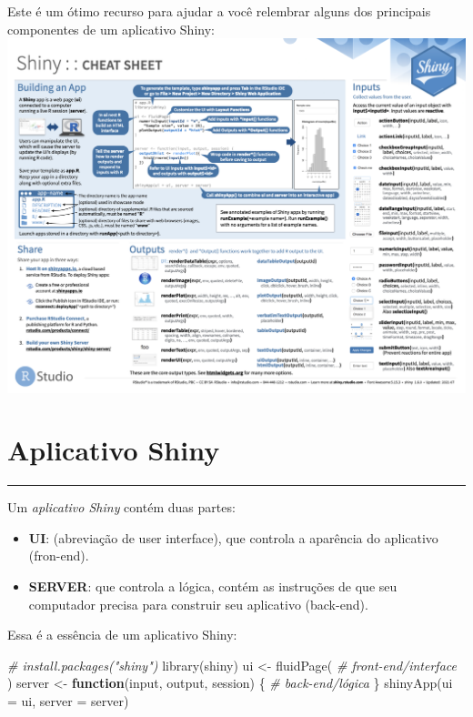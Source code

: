 \documentclass[
]{book}
\newenvironment{Shaded}{\begin{snugshade}}{\end{snugshade}}
\newcommand{\AttributeTok}[1]{\textcolor[rgb]{0.77,0.63,0.00}{#1}}
\newcommand{\CommentTok}[1]{\textcolor[rgb]{0.56,0.35,0.01}{\textit{#1}}}
\newcommand{\ControlFlowTok}[1]{\textcolor[rgb]{0.13,0.29,0.53}{\textbf{#1}}}
\newcommand{\FunctionTok}[1]{\textcolor[rgb]{0.00,0.00,0.00}{#1}}
\newcommand{\NormalTok}[1]{#1}
\newcommand{\OtherTok}[1]{\textcolor[rgb]{0.56,0.35,0.01}{#1}}
\begin{document}
Este é um ótimo recurso para ajudar a você relembrar alguns dos principais componentes de um aplicativo Shiny:
\includegraphics{www/img/cheatsheet.png}

\hypertarget{aplicativo-shiny}{%
\chapter{\texorpdfstring{\textbf{Aplicativo Shiny}}{Aplicativo Shiny}}\label{aplicativo-shiny}}

\begin{center}\rule{0.5\linewidth}{0.5pt}\end{center}

Um \emph{aplicativo Shiny} contém duas partes:

\begin{itemize}
\item
  \textbf{UI}: (abreviação de user interface), que controla a aparência do aplicativo (fron-end).
\item
  \textbf{SERVER}: que controla a lógica, contém as instruções de que seu computador precisa para construir seu aplicativo (back-end).
\end{itemize}

Essa é a essência de um aplicativo Shiny:

\begin{Shaded}
\begin{Highlighting}[]
\CommentTok{\# install.packages("shiny")}
\FunctionTok{library}\NormalTok{(shiny)}
\NormalTok{ui }\OtherTok{\textless{}{-}} \FunctionTok{fluidPage}\NormalTok{(}
  \CommentTok{\# front{-}end/interface}
\NormalTok{)}
\NormalTok{server }\OtherTok{\textless{}{-}} \ControlFlowTok{function}\NormalTok{(input, output, session) \{}
  \CommentTok{\# back{-}end/lógica}
\NormalTok{\}}
\FunctionTok{shinyApp}\NormalTok{(}\AttributeTok{ui =}\NormalTok{ ui, }\AttributeTok{server =}\NormalTok{ server)}
\end{Highlighting}
\end{Shaded}
\end{document}
